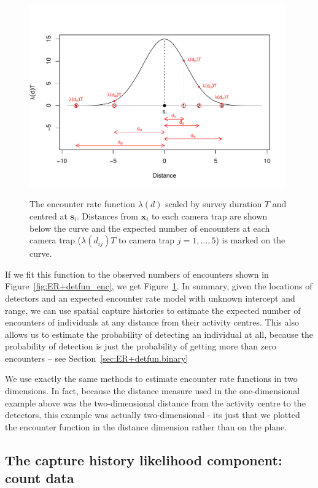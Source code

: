 \documentclass[graybox,envcountchap,sectrefs]{SpringerStyleFiles/styles/svmono}\usepackage[]{graphicx}\usepackage[]{color}
\begin{document}
\begin{figure}[ht]
\caption{\small The encounter rate function $\lambda(d)$ scaled by survey duration $T$ and centred at $\bm{s}_i$. Distances from $\bm{x}_i$ to each camera trap are shown below the curve and the expected number of encounters at each camera trap ($\lambda(d_{ij})T$ to camera trap $j=1,\ldots,5$) is marked on the curve.}
\centering
\vspace{-24pt}
\includegraphics[width=11cm]{keepfigure/ENwithdists.pdf}
\label{fig:ER+detfun_ENwithdists}
\end{figure}

If we fit this function to the observed numbers of encounters shown in Figure~\ref{fig:ER+detfun_enc}, we get Figure~\ref{fig:ER+detfun_ENwithdists}. In summary, given the locations of detectors and an expected encounter rate model with unknown intercept and range, we can use spatial capture histories to estimate the expected number of encounters of individuals at any distance from their activity centres. This also allows us to estimate the probability of detecting an individual at all, because the probability of detection is just the probability of getting more than zero encounters -- see Section~\ref{sec:ER+detfun.binary}

We use exactly the same methods to estimate encounter rate functions in two dimensions. In fact, because the distance measure used in the one-dimensional example above was the two-dimensional distance from the activity centre to the detectors, this example was actually two-dimensional - its just that we plotted the encounter function in the distance dimension rather than on the plane.

\subsection{The capture history likelihood component: count data}
\label{subsec:ER+detfun.ERlikelihood}
\end{document}
